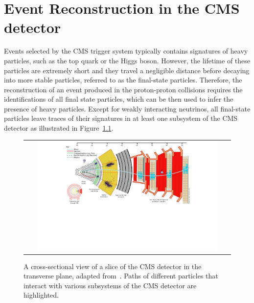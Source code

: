 \chapter{Event Reconstruction in the CMS detector}
\label{chap:Event}

Events selected by the \ac{CMS} trigger system typically contains signatures of heavy particles, such as the top quark or the Higgs boson. However, the lifetime of these particles are extremely short and they travel a negligible distance before decaying into more stable particles, referred to as the final-state particles. Therefore, the reconstruction of an event produced in the proton-proton collisions requires the identifications of all final state particles, which can be then used to infer the presence of heavy particles. Except for weakly interacting neutrinos, all final-state particles leave traces of their signatures in at least one subsystem of the \ac{CMS} detector as illustrated in Figure~\ref{fig:PF}.

\begin{figure}[tbh!]
 \begin{center}
 \begin{tabular}{c}
 \includegraphics[width=0.9\textwidth]{figures/Part2/Event/PF}
 \end{tabular}
 \caption{A cross-sectional view of a slice of the \ac{CMS} detector in the transverse plane, adapted from~\cite{Barney:2018}. Paths of different particles that interact with various subsystems of the \ac{CMS} detector are highlighted.}
 \label{fig:PF}
 \end{center}
\end{figure}

